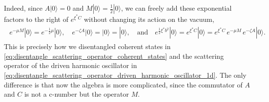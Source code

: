 \documentclass[../QFT_main.tex]{subfiles}
\begin{document}
\begin{mytheorem}
Indeed, since $A|0\rangle=0$ and $M|0\rangle=\tfrac12 |0\rangle$, we can freely add these exponential factors to the right of $e^{\xi^* C}$ without changing its action on the vacuum, 
\begin{align}
\begin{aligned}
   e^{-\mu M}|0\rangle = e^{-\tfrac12\mu} |0\rangle,\quad e^{-\zeta A}|0\rangle = |0\rangle =|0\rangle, \quad \text{and}\quad e^{\frac12 \xi^* b^2} |0\rangle = e^{\xi^* C} |0\rangle = e^{\xi^* C}\,e^{-\mu M}\,e^{-\zeta A}|0\rangle.
\end{aligned}\end{align}
This is precisely how we disentangled coherent states in \eqref{eq:disentangle_scattering_operator_coherent_states} and the scattering operator of the driven harmonic oscillator in \eqref{eq:disentangle_scattering_operator_driven_harmonic_oscillator_1d}.
The only difference is that now the algebra is more complicated, since the commutator of $A$ and $C$ is not a c-number but the operator $M$.


\end{mytheorem}
\end{document}
